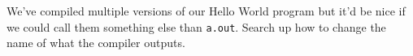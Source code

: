 %
We've compiled multiple versions of our Hello World program but it'd be
nice if we could call them something else than \texttt{a.out}.  Search
up how to change the name of what the compiler outputs.
